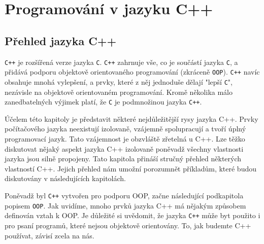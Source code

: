 \setchaptertoc
\chapter{Programování v jazyku C++}


  \section{Přehled jazyka C++}\label{CPP:IsecI}
    \texttt{C++} je rozšířená verze jazyka \texttt{C}. \texttt{C++} zahrnuje vše, co je součástí 
    jazyka \texttt{C}, a přidává podporu objektově orientovaného programování (zkráceně 
    \texttt{OOP}). \texttt{C++} navíc obsahuje mnohá vylepšení, a prvky, které z něj jednoduše 
    dělají "lepší \texttt{C}", nezávisle na objektově orientovaném programování. Kromě několika 
    málo zanedbatelných výjimek platí, že \texttt{C} je podmnožinou jazyka \texttt{C++}.


    Účelem této kapitoly je představit některé nejdůležitější rysy jazyka C++. Prvky počítačového
    jazyka neexistují izolovaně, vzájemně spolupracují a tvoří úplný programovací jazyk.  Tato
    vzájemnost je obzvláště zřetelná u C++. Lze těžko diskutovat nějaký aspekt jazyka C++ izolovaně
    poněvadž všechny vlastnosti jazyka jsou silně propojeny. Tato kapitola přináší stručný přehled
    některých vlastností C++. Jejich přehled nám umožní porozumnět příkladům, které budou
    diskutovány v následujících kapitolách. 
  
    Poněvadž byl \texttt{C++} vytvořen pro podporu OOP, začne následující podkapitola popisem
    \texttt{OOP}. Jak uvidíme, mnoho prvků jazyka C++ má nějakým způsobem definován vztah k OOP. Je
    důležité si uvědomit, že jazyka \texttt{C++} může byt použito i pro psaní programů, které nejsou
    objektově orientovány. To, jak budemte C++ používat, závisí zcela na nás. 
    
